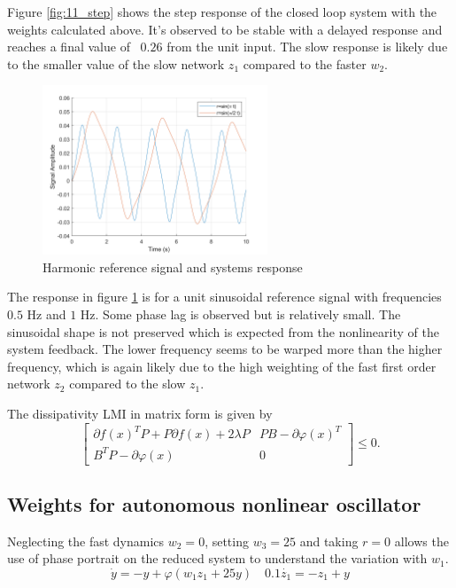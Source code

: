 \documentclass{article}
\begin{document}
Figure \ref{fig:11_step} shows the step response of the closed loop system with the weights calculated above.
It's observed to be stable with a delayed response and reaches a final value of ~$0.26$ from the unit input.
The slow response is likely due to the smaller value of the slow network $z_1$ compared to the faster $w_2$.

\begin{figure}[H]
    \centering
    \includegraphics[width=0.6\textwidth]{figures/11_harmonic_reference.png}
    \caption{Harmonic reference signal and systems response}
    \label{fig:11_harmonic}
\end{figure}

The response in figure \ref{fig:11_harmonic} is for a unit sinusoidal reference signal with frequencies $0.5$ Hz and $1$ Hz.
Some phase lag is observed but is relatively small. The sinusoidal shape is not preserved which is expected from the nonlinearity of the system feedback.
The lower frequency seems to be warped more than the higher frequency, which is again likely due to the high weighting of the fast first order network $z_2$ compared to the slow $z_1$.

The dissipativity LMI in matrix form is given by
\begin{equation}    
\left[
\begin{array}{cc}
\partial f(x)^T P + P \partial f(x) + 2\lambda P & PB - \partial \varphi(x)^T \\
B^T P - \partial \varphi(x) & 0
\end{array}
\right] \leq 0.
\end{equation}

\subsection{Weights for autonomous nonlinear oscillator}
Neglecting the fast dynamics $w_2 = 0$, setting $w_3 = 25$ and taking $r = 0$ allows the
use of phase portrait on the reduced system to understand the variation with $w_1$.
\begin{equation}
    \dot{y} = -y + \varphi(w_1z_1 + 25y) \quad 0.1 \dot{z_1} = -z_1 + y
\end{equation}
\end{document}

